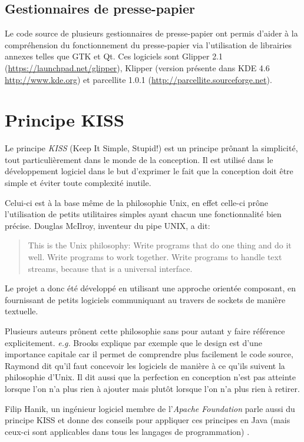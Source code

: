 \section*{Gestionnaires de presse-papier}
Le code source de plusieurs gestionnaires de presse-papier ont permis d'aider
à la compréhension du fonctionnement du presse-papier via l'utilisation de
librairies annexes telles que GTK et Qt.
Ces logiciels sont Glipper 2.1 (\url{https://launchpad.net/glipper}), Klipper
(version présente dans KDE 4.6 \url{http://www.kde.org}) et parcellite 1.0.1
(\url{http://parcellite.sourceforge.net}).

\chapter{Principe KISS}\label{ann:kiss}
\renewcommand{\leftmark}{ANNEXE \thechapter.~~Principe KISS}
\label{annexe2}
Le principe \emph{KISS} (Keep It Simple, Stupid!) \cite{wiki:kiss} est un
principe prônant la simplicité, tout particulièrement dans le monde de la
conception.
Il est utilisé dans le développement logiciel dans le but d'exprimer le fait
que la conception doit être simple et éviter toute complexité inutile.

Celui-ci est à la base même de la philosophie Unix, en effet celle-ci prône
l'utilisation de petits utilitaires simples ayant chacun une fonctionnalité
bien précise.
Douglas McIlroy, inventeur du pipe UNIX, a dit\cite{quartercentury-unix}:
\begin{quote}
  This is the Unix philosophy: Write programs that do one thing and do
  it well. Write programs to work together. Write programs to handle
  text streams, because that is a universal interface.
\end{quote}
Le projet a donc été développé en utilisant une approche orientée
composant\cite{wiki:poc}, en fournissant de petits
logiciels communiquant au travers de sockets de manière textuelle.

Plusieurs auteurs
\cite{Brooks1995, Raymond2001} prônent cette philosophie sans pour autant
y faire référence explicitement. \emph{e.g.} Brooks explique par exemple
que le design est d'une importance capitale car il permet de comprendre
plus facilement le code source, Raymond dit qu'il faut concevoir les logiciels
de manière à ce qu'ils suivent la philosophie d'Unix. Il dit aussi que
la perfection en conception n'est pas atteinte lorsque l'on n'a plus rien à
ajouter mais plutôt lorsque l'on n'a plus rien à retirer.

Filip Hanik, un ingénieur logiciel membre de l'\emph{Apache Foundation} parle
aussi du principe KISS et donne des conseils pour appliquer ces principes en
Java (mais ceux-ci sont applicables dans tous les langages de programmation)
\cite{fhanikKISS}.
